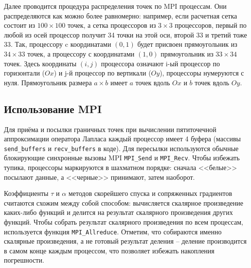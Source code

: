 \documentclass[12pt,notitlepage,oneside]{extarticle}
\begin{document}
Далее проводится процедура распределения точек по MPI процессам. Они
распределяются как можно более равномерно: например, если расчетная сетка
состоит из $100 \times 100$ точек, а сетка процессоров из $3 \times 3$
процессоров, первый по любой из осей процессор получит 34 точки на этой оси,
второй 33 и третий тоже 33. Так, процессору c координатами $(0, 1)$ будет
присвоен прямоугольник из $34 \times 33$ точек, а процессору с координатами
$(1, 0)$ прямоугольник из $33 \times 34$ точек. Здесь координаты $(i, j)$
процессора означают i-ый процессор по горизонтали ($Ox$) и j-й процессор
по вертикали ($Oy$), процессоры нумеруются с нуля. Прямоугольник размера
$a \times b$ имеет $a$ точек вдоль $Ox$ и $b$ точек вдоль $Oy$.

\subsection{Использование MPI}
Для приёма и посылки граничных точек при вычислении пятиточечной аппроксимации
оператора Лапласа каждый процессор имеет 4 буфера (массивы \texttt{send\_buffers}
и \texttt{recv\_buffers} в коде). Для пересылки используются обычные блокирующие
синхронные вызовы MPI \texttt{MPI\_Send} и \texttt{MPI\_Recv}. Чтобы избежать
тупика, процессоры маркируются в шахматном порядке: сначала <<белые>> посылают
данные, а <<черные>> принимают, затем наоборот.

Коэффициенты $\tau$ и $\alpha$ методов скорейшего спуска и сопряженных
градиентов считаются схожим между собой способом: вычисляется скалярное
произведение каких-либо функций и делится на результат скалярного произведения
других функций.  Чтобы собрать результат скалярного произведения по всем
процессам, используется функция \texttt{MPI\_Allreduce}. Отметим, что собираются
именно скалярные произведения, а не готовый результат деления -- деление
производится в самом конце каждым процессом, что позволяет избежать накопления
погрешности.
\end{document}
